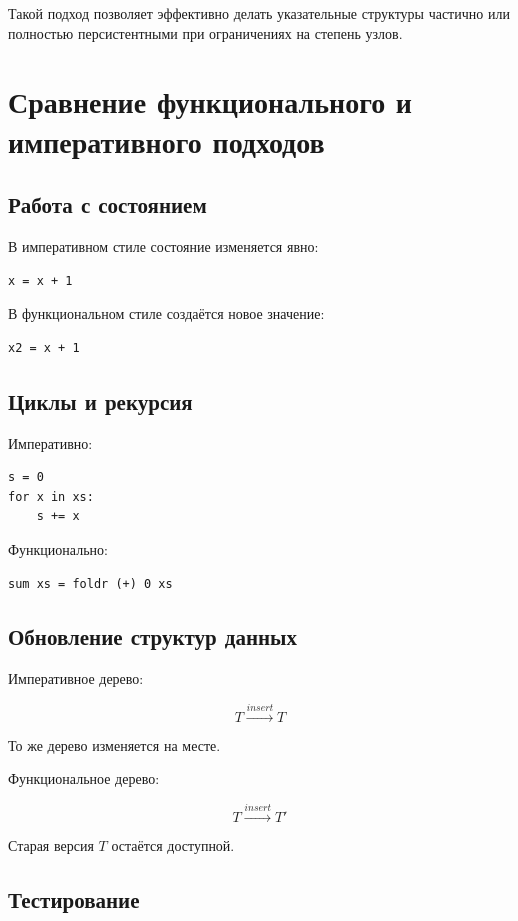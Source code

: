 \documentclass[12pt,a4paper]{article}
\begin{document}
Такой подход позволяет эффективно делать указательные структуры частично или полностью персистентными при ограничениях на степень узлов.

\section{Сравнение функционального и императивного подходов}

\subsection{Работа с состоянием}

В императивном стиле состояние изменяется явно:

\begin{lstlisting}
x = x + 1
\end{lstlisting}

В функциональном стиле создаётся новое значение:

\begin{lstlisting}
x2 = x + 1
\end{lstlisting}

\subsection{Циклы и рекурсия}

Императивно:

\begin{lstlisting}
s = 0
for x in xs:
    s += x
\end{lstlisting}

Функционально:

\begin{lstlisting}
sum xs = foldr (+) 0 xs
\end{lstlisting}

\subsection{Обновление структур данных}

Императивное дерево:

\[
T \xrightarrow{insert} T
\]

То же дерево изменяется на месте.

Функциональное дерево:

\[
T \xrightarrow{insert} T'
\]

Старая версия $T$ остаётся доступной.

\subsection{Тестирование}
\end{document}
